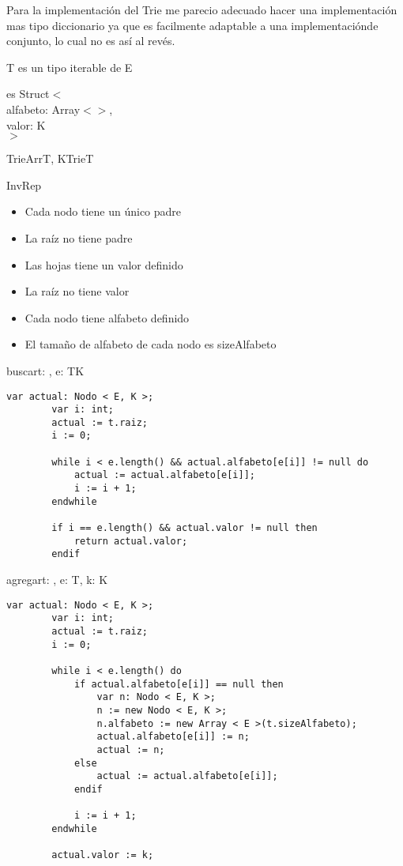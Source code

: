 Para la implementación del Trie me parecio adecuado hacer una implementación mas tipo diccionario ya que es facilmente adaptable a una implementaciónde conjunto, lo cual no es así al revés.

T es un tipo iterable de E

\newcommand{\nodoTrie}{}

\nodoTrie es Struct$<$ \\
\Indent\Indent alfabeto: Array$<$\nodoTrie$>$,\\
\Indent\Indent valor: K\\
\Indent$>$
\pagebreak
\begin{module}{TrieArr}{T, K}{Trie}{T}
	\var{raiz}{\nodoTrie}

	\medskip
	InvRep
	\begin{itemize}
		\item Cada nodo tiene un único padre
		\item La raíz no tiene padre
		\item Las hojas tiene un valor definido
		\item La raíz no tiene valor
		\item Cada nodo tiene alfabeto definido
		\item El tamaño de alfabeto de cada nodo es sizeAlfabeto
	\end{itemize}

	\begin{proc}{buscar}{\In t: \moduletype, \In e: T}{K}
		\begin{lstlisting}[numbers=none,frame=none]
		var actual: Nodo < E, K >;
		var i: int;
		actual := t.raiz;
		i := 0;

		while i < e.length() && actual.alfabeto[e[i]] != null do
			actual := actual.alfabeto[e[i]];
			i := i + 1;
		endwhile

		if i == e.length() && actual.valor != null then
			return actual.valor;
		endif
		\end{lstlisting}
	\end{proc}

	\begin{proc}{agregar}{\Inout t: \moduletype, \In e: T, \In k: K}{}
		\begin{lstlisting}[numbers=none,frame=none]
		var actual: Nodo < E, K >;
		var i: int;
		actual := t.raiz;
		i := 0;

		while i < e.length() do
			if actual.alfabeto[e[i]] == null then
				var n: Nodo < E, K >;
				n := new Nodo < E, K >;
				n.alfabeto := new Array < E >(t.sizeAlfabeto);
				actual.alfabeto[e[i]] := n;
				actual := n;
			else
				actual := actual.alfabeto[e[i]];
			endif

			i := i + 1;
		endwhile

		actual.valor := k;
		\end{lstlisting}
	\end{proc}

\end{module}

